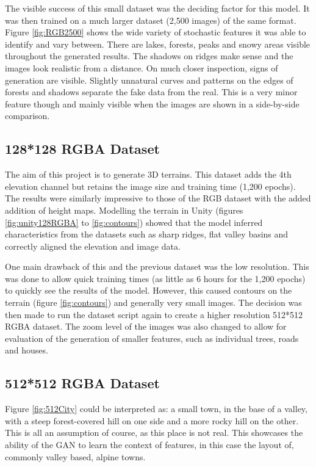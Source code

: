 \documentclass[a4paper]{report}
\begin{document}
The visible success of this small dataset was the deciding factor for this model. It was then trained on a much larger dataset (2,500 images) of the same format. Figure \ref{fig:RGB2500} shows the wide variety of stochastic features it was able to identify and vary between. There are lakes, forests, peaks and snowy areas visible throughout the generated results. The shadows on ridges make sense and the images look realistic from a distance. On much closer inspection, signs of generation are visible. Slightly unnatural curves and patterns on the edges of forests and shadows separate the fake data from the real. This is a very minor feature though and mainly visible when the images are shown in a side-by-side comparison.

\subsection{128*128 RGBA Dataset}
The aim of this project is to generate 3D terrains. This dataset adds the 4th elevation channel but retains the image size and training time (1,200 epochs). The results were similarly impressive to those of the RGB dataset with the added addition of height maps. Modelling the terrain in Unity (figures \ref{fig:unity128RGBA} to \ref{fig:contours}) showed that the model inferred characteristics from the datasets such as sharp ridges, flat valley basins and correctly aligned the elevation and image data.

One main drawback of this and the previous dataset was the low resolution. This was done to allow quick training times (as little as 6 hours for the 1,200 epochs) to quickly see the results of the model. However, this caused contours on the terrain (figure \ref{fig:contours}) and generally very small images. The decision was then made to run the dataset script again to create a higher resolution 512*512 RGBA dataset. The zoom level of the images was also changed to allow for evaluation of the generation of smaller features, such as individual trees, roads and houses.

\subsection{512*512 RGBA Dataset}
Figure \ref{fig:512City} could be interpreted as: a small town, in the base of a valley, with a steep forest-covered hill on one side and a more rocky hill on the other. This is all an assumption of course, as this place is not real. This showcases the ability of the GAN to learn the context of features, in this case the layout of, commonly valley based, alpine towns.
\end{document}
